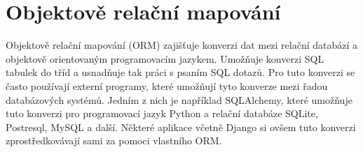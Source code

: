 \section{Objektově relační mapování}

Objektově relační mapování (ORM) zajišťuje konverzi dat mezi relační databází a objektově orientovaným programovacím jazykem. Umožňuje konverzi SQL tabulek do tříd a usnadňuje tak práci s psaním SQL dotazů. Pro tuto konverzi se často používají externí programy, které umožňují tyto konverze mezi řadou databázových systémů. Jedním z nich je například SQLAlchemy, které umožňuje tuto konverzi pro programovací jazyk Python a relační databáze SQLite, Postresql, MySQL a další. Některé aplikace včetně Django si ovšem tuto konverzi zprostředkovávají sami za pomoci vlastního ORM. \cite{orm} \cite{sqlalchemy}

\textbf{}
\textit{}




